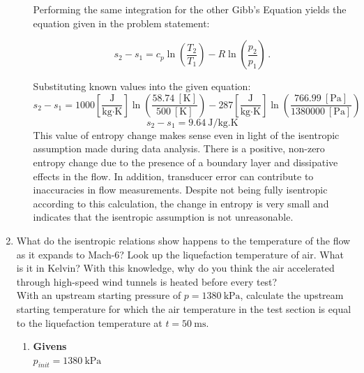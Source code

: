 \documentclass[12pt,letterpaper]{article}
\begin{document}
\begin{enumerate}[label=(\alph*)]
\begin{enumerate}[label=\arabic*.]
			Performing the same integration for the other Gibb's Equation yields the equation given in the problem statement:

			\begin{equation*}
				s_2 - s_1 = c_p \ln(\frac{T_2}{T_1}) - R \ln(\frac{p_2}{p_1}) \,.
			\end{equation*}

			Substituting known values into the given equation:
			\begin{equation*}
				s_2 - s_1 = 1000 \left[\frac{\unit{\joule}}{\unit{\kilogram}\cdot \unit{\kelvin}}\right] 
				\ln{\left(\frac{58.74 \ [\unit{\kelvin}]}{500 \ [\unit{\kelvin}]}\right)}
				- 287 \left[\frac{\unit{\joule}}{\unit{\kilogram}\cdot \unit{\kelvin}}\right] 
				\ln{\left(\frac{766.99 \ [\unit{\pascal}]}{1380000 \ [\unit{\pascal}]}\right)}
			\end{equation*}
			\begin{equation*}
				\boxed{s_2-s_1 = 9.64 \ \unit{\joule/\kilogram.\kelvin}}
			\end{equation*}
			This value of entropy change makes sense even in light of the isentropic assumption made during data analysis. 
			There is a positive, non-zero entropy change due to the presence of a boundary layer and dissipative effects in the flow. 
			In addition, transducer error can contribute to inaccuracies in flow measurements. 
			Despite not being fully isentropic according to this calculation, the change in entropy is very small and indicates that the isentropic assumption is not unreasonable.
			
		\end{enumerate}

			\item What do the isentropic relations show happens to the temperature of the flow as it expands to Mach-6? Look up the liquefaction temperature of air. What is it in Kelvin? With
			this knowledge, why do you think the air accelerated through high-speed wind tunnels is
			heated before every test?\\
			With an upstream starting pressure of $p = 1380 \  \unit{\kilo\pascal}$, calculate the upstream starting temperature for which the air temperature in the test section is equal to the liquefaction temperature at $ t = 50 \ \unit{\milli\second}$.
		\begin{enumerate}[label=\arabic*.]
			\item{\textbf{Givens}}\\
			$p_{init} = 1380 \ \unit{\kilo\pascal}$
			

\end{enumerate}
\end{enumerate}
\end{document}
